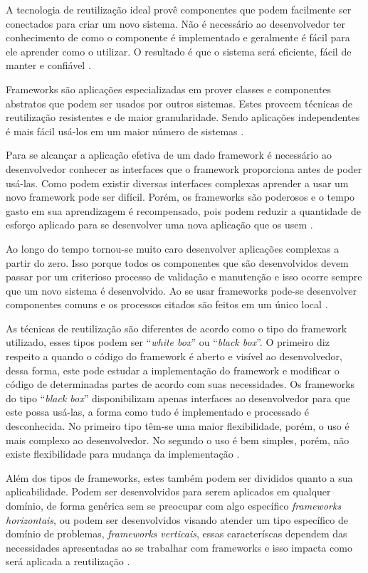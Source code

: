 A tecnologia de reutilização ideal provê componentes que podem facilmente ser conectados para criar um novo sistema. Não é necessário ao desenvolvedor ter conhecimento de como o componente é implementado e geralmente é fácil para ele aprender como o utilizar. O resultado é que o sistema será eficiente, fácil de manter e confiável \cite{Johnson:1997}.

Frameworks são aplicações especializadas em prover classes e componentes abstratos que podem ser usados por outros sistemas. Estes proveem técnicas de reutilização resistentes e de maior granularidade. Sendo aplicações independentes é mais fácil usá-los em um maior número de sistemas \cite{Johnson:Foote:1988}.

Para se alcançar a aplicação efetiva de um dado framework é necessário ao desenvolvedor conhecer as interfaces que o framework proporciona antes de poder usá-las. Como podem existir diversas interfaces complexas aprender a usar um novo framework pode ser difícil. Porém, os frameworks são poderosos e o tempo gasto em sua aprendizagem é recompensado, pois podem reduzir a quantidade de esforço aplicado para se desenvolver uma nova aplicação que os usem \cite{Johnson:1997}.

Ao longo do tempo tornou-se muito caro desenvolver aplicações complexas a partir do zero. Isso porque todos os componentes que são desenvolvidos devem passar por um criterioso processo de validação e manutenção e isso ocorre sempre que um novo sistema é desenvolvido. Ao se usar frameworks pode-se desenvolver componentes comuns e os processos citados são feitos em um único local \cite{Fayad:Schimidt:1997}.

As técnicas de reutilização são diferentes de acordo como o tipo do framework utilizado, esses tipos podem ser ``\textit{white box}'' ou ``\textit{black box}''. O primeiro diz respeito a quando o código do framework é aberto e visível ao desenvolvedor, dessa forma, este pode estudar a implementação do framework e modificar o código de determinadas partes de acordo com suas necessidades. Os frameworks do tipo ``\textit{black box}'' disponibilizam apenas interfaces ao desenvolvedor para que este possa usá-las, a forma como tudo é implementado e processado é desconhecida. No primeiro tipo têm-se uma maior flexibilidade, porém, o uso é mais complexo ao desenvolvedor. No segundo o uso é bem simples, porém, não existe flexibilidade para mudança da implementação \cite{Kroth:2000}.

Além dos tipos de frameworks, estes também podem ser divididos quanto a sua aplicabilidade. Podem ser desenvolvidos para serem aplicados em qualquer domínio, de forma genérica sem se preocupar com algo específico \textit{frameworks horizontais}, ou podem ser desenvolvidos visando atender um tipo específico de domínio de problemas, \textit{frameworks verticais}, essas caracteríscas dependem das necessidades apresentadas ao se trabalhar com frameworks e isso impacta como será aplicada a reutilização \cite{Kroth:2000}.

